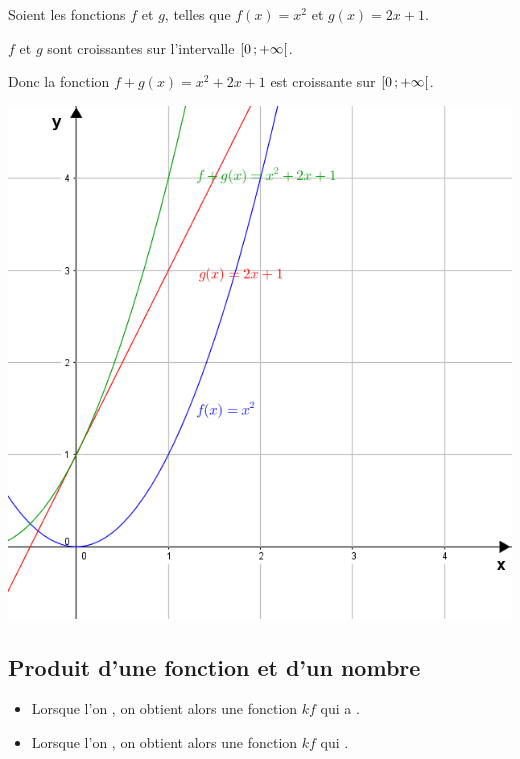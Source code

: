 \documentclass[12pt,a4paper]{article}
\begin{document}
\begin{myex}
	\begin{multicols}{2}
		\vspace*{20mm}
		
		Soient les fonctions $f$ et $g$, telles que $f(x) = x^2$ et $g(x)=2x+1$.
		
		$f$ et $g$ sont croissantes sur l'intervalle $\mbox{\ensuremath{\left[0\mathpunct{};+\infty\right[}}$.
		
		Donc la fonction $f+g(x) = x^2 + 2x + 1$ est croissante sur $\mbox{\ensuremath{\left[0\mathpunct{};+\infty\right[}}$.
		
		\includegraphics[scale=0.6]{./img/f+g}
	\end{multicols}
\end{myex}

\subsection{Produit d'une fonction et d'un nombre}

\begin{myprops}
	\begin{itemize}
		\item Lorsque l'on , on obtient alors une fonction $kf$ qui a .
		\item Lorsque l'on , on obtient alors une fonction $kf$ qui .
	\end{itemize}
\end{myprops}
\end{document}
